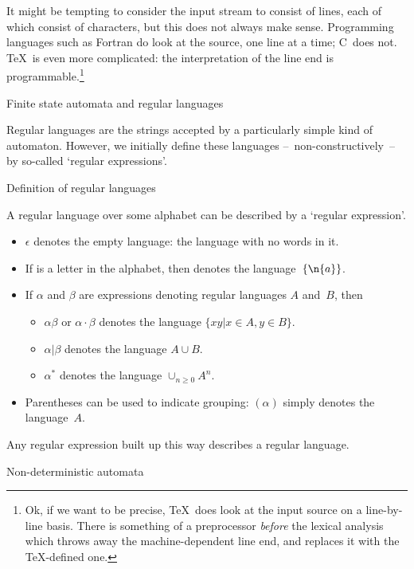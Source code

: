\begin{remark}
It might be tempting to consider the input stream to consist of
lines, each of which consist of characters, but this does not always
make sense. Programming languages such as Fortran do look at the
source, one line at a time; C~does not. \TeX\ is even more
complicated: the interpretation of the line end is
programmable.\footnote{Ok, if we want to be precise, \TeX\ does look
at the input source on a line-by-line basis. There is something of
a preprocessor {\em before} the lexical analysis which throws away the
machine-dependent line end, and replaces it with the \TeX-defined
one.}
\end{remark}

 {Finite state automata and regular languages}
\label{sec:fsa}

Regular languages are the strings accepted by a particularly simple
kind of automaton. However, we initially define these languages
--~non-constructively~-- by so-called `regular expressions'.

 {Definition of regular languages}

A regular language over some alphabet can be described by a
`regular expression'.
\begin{itemize}
\item $\epsilon$ denotes the empty language: the language with no
  words in it.
\item If  is a letter in the alphabet, then  denotes the
  language~$\{\n{a}\}$.
\item If $\alpha$ and $\beta$ are expressions denoting regular
  languages $A$ and~$B$, then
\begin{itemize}
\item $\alpha\beta$ or $\alpha\cdot\beta$ denotes the language
  $\{xy|x\in A,y\in B\}$.
\item $\alpha|\beta$ denotes the language $A\cup B$.
\item $\alpha^*$ denotes the language $\cup_{n\geq 0}A^n$.
\end{itemize}
\item Parentheses can be used to indicate grouping: $(\alpha)$ simply
  denotes the language~$A$.
\end{itemize}
Any regular expression built up this way describes a regular language.

 {Non-deterministic automata}
\label{sec:nfa}

